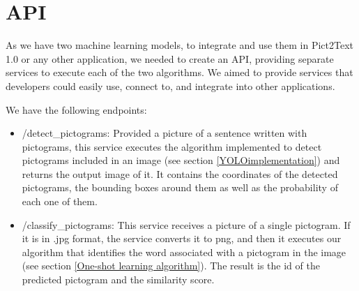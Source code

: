 \begin{table}[!ht]
\begin{center}
\end{center}
\caption{Best results obtained during the first, third and forth training in version four of the pictogram identification algorithm respectively.}
\label{table:trainingv4}
\end{table}

\section{API}
\label{API}

As we have two machine learning models, to integrate and use them in Pict2Text 1.0 or any other application, we needed to create an API, providing separate services to execute each of the two algorithms. We aimed to provide services that developers could easily use, connect to, and integrate into other applications.

We have the following endpoints:
\begin{itemize}
\item /detect\_pictograms: Provided a picture of a sentence written with pictograms, this service executes the algorithm implemented to detect pictograms included in an image (see section \ref{YOLOimplementation}) and returns the output image of it. It contains the coordinates of the detected pictograms, the bounding boxes around them as well as the probability of each one of them.

\item /classify\_pictograms: This service receives a picture of a single pictogram. If it is in .jpg format, the service converts it to png, and then it executes our algorithm that identifies the word associated with a pictogram in the image (see section \ref{One-shot learning algorithm}). The result is the id of the predicted pictogram and the similarity score.
\end{itemize}

